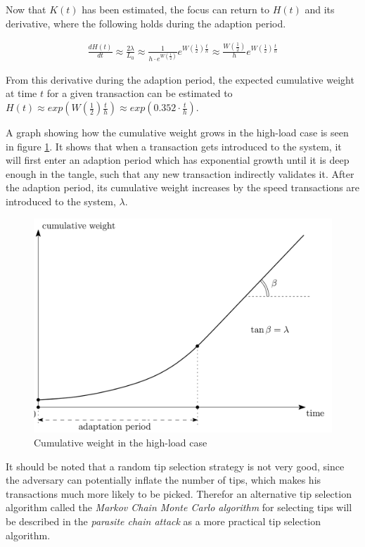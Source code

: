Now that $K(t)$ has been estimated, the focus can return to $H(t)$ and its derivative, where the following holds during the adaption period.

\begin{align*}
    \frac{dH(t)}{dt} \approx \frac{2\lambda}{L_0}
    \approx \frac{1}{h \cdot e^{W(\frac{1}{2})}} e^{W(\frac{1}{2})\frac{t}{h}}
    \approx \frac{W(\frac{1}{2})}{h} e^{W(\frac{1}{2})\frac{t}{h}}
\end{align*}

From this derivative during the adaption period, the expected cumulative weight at time $t$ for a given transaction can be estimated to $H(t) \approx exp(W(\frac{1}{2})\frac{t}{h})\approx exp(0.352 \cdot \frac{t}{h})$.


A graph showing how the cumulative weight grows in the high-load case is seen in figure \ref{fig:iota-cumulative-weight}. It shows that when a transaction gets introduced to the system, it will first enter an adaption period which has exponential growth until it is deep enough in the tangle, such that any new transaction indirectly validates it. After the adaption period, its cumulative weight increases by the speed transactions are introduced to the system, $\lambda$.

\begin{figure}[H]
    \centering
    \includegraphics[scale=0.3]{images/iota-cumulative-weight-graph.png}
    \caption{Cumulative weight in the high-load case}
    \label{fig:iota-cumulative-weight}
\end{figure}

It should be noted that a random tip selection strategy is not very good, since the adversary can potentially inflate the number of tips, which makes his transactions much more likely to be picked. Therefor an alternative tip selection algorithm called the \emph{Markov Chain Monte Carlo algorithm} for selecting tips will be described in the \emph{parasite chain attack} as a more practical tip selection algorithm.

